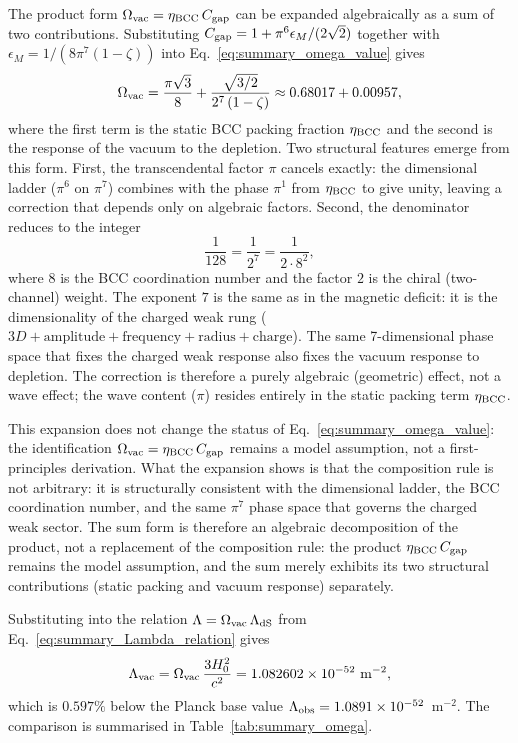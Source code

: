 \documentclass[10pt,a4paper]{article}
\begin{document}
The product form $\Omega_{\rm vac} = \eta_{\rm BCC}\,C_{\rm gap}$
can be expanded algebraically as a sum of two contributions. Substituting
$C_{\rm gap} = 1 + \pi^6 \epsilon_M/(2\sqrt{2})$ together with
$\epsilon_M = 1/(8\pi^7(1-\zeta))$ into
Eq.~\eqref{eq:summary_omega_value} gives
\begin{equation}
	\Omega_{\rm vac}
	= \frac{\pi\sqrt{3}}{8}
	+ \frac{\sqrt{3/2}}{2^7\,(1-\zeta)}
	\approx 0.68017 + 0.00957,
	\label{eq:summary_omega_expanded}
\end{equation}
where the first term is the static BCC packing fraction
$\eta_{\rm BCC}$ and the second is the response of the vacuum to
the depletion. Two structural features emerge from this form.
First, the transcendental factor $\pi$ cancels exactly: the
dimensional ladder ($\pi^6$ on $\pi^7$) combines with the phase
$\pi^1$ from $\eta_{\rm BCC}$ to give unity, leaving a correction
that depends only on algebraic factors. Second, the denominator
reduces to the integer
\begin{equation}
	\frac{1}{128}
	= \frac{1}{2^7}
	= \frac{1}{2\cdot 8^2},
	\label{eq:summary_128}
\end{equation}
where $8$ is the BCC coordination number and the factor $2$ is the
chiral (two-channel) weight. The exponent $7$ is the same as in the
magnetic deficit: it is the dimensionality of the charged weak
rung ($3D + \text{amplitude} + \text{frequency} + \text{radius}
+ \text{charge}$). The same 7-dimensional phase space that fixes
the charged weak response also fixes the vacuum response to
depletion. The correction is therefore a purely algebraic
(geometric) effect, not a wave effect; the wave content ($\pi$)
resides entirely in the static packing term $\eta_{\rm BCC}$.

This expansion does not change the status of
Eq.~\eqref{eq:summary_omega_value}: the identification
$\Omega_{\rm vac} = \eta_{\rm BCC}\,C_{\rm gap}$ remains a model
assumption, not a first-principles derivation. What the expansion
shows is that the composition rule is not arbitrary: it is
structurally consistent with the dimensional ladder, the BCC
coordination number, and the same $\pi^7$ phase space that governs
the charged weak sector.
The sum form is therefore an algebraic decomposition of the
product, not a replacement of the composition rule: the product
$\eta_{\rm BCC}\,C_{\rm gap}$ remains the model assumption, and the
sum merely exhibits its two structural contributions (static
packing and vacuum response) separately.

Substituting into the relation
$\Lambda = \Omega_{\rm vac}\,\Lambda_{\rm dS}$ from
Eq.~\eqref{eq:summary_Lambda_relation} gives
\begin{equation}
	\Lambda_{\rm vac}
	= \Omega_{\rm vac}\,\frac{3 H_0^2}{c^2}
	= 1.082602\times 10^{-52}\ {\rm m^{-2}},
	\label{eq:summary_Lambda_pred}
\end{equation}
which is \(0.597\%\) below the Planck base value
$\Lambda_{\rm obs} = 1.0891\times 10^{-52}$~m$^{-2}$. The comparison
is summarised in Table~\ref{tab:summary_omega}.
\end{document}

